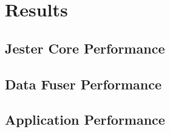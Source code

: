 \chapter{Results}
\section{Jester Core Performance}
\section{Data Fuser Performance}
\section{Application Performance}